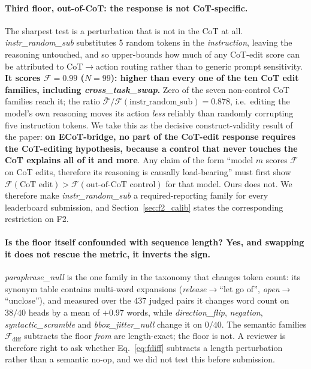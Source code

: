 \documentclass{article}
\begin{document}
\paragraph{Third floor, out-of-CoT: the response is not CoT-specific.} The sharpest test is a perturbation that is not in the CoT at all. \emph{instr\_random\_sub} substitutes 5 random tokens in the \emph{instruction}, leaving the reasoning untouched, and so upper-bounds how much of any CoT-edit score can be attributed to CoT$\to$action routing rather than to generic prompt sensitivity. \textbf{It scores $\mathcal{F} = 0.99$ ($N{=}99$): higher than every one of the ten CoT edit families, including \emph{cross\_task\_swap}.} Zero of the seven non-control CoT families reach it; the ratio $\bar{\mathcal{F}} / \mathcal{F}(\text{instr\_random\_sub}) = 0.878$, i.e.\ editing the model's own reasoning moves its action \emph{less} reliably than randomly corrupting five instruction tokens. We take this as the decisive construct-validity result of the paper: \textbf{on ECoT-bridge, no part of the CoT-edit response requires the CoT-editing hypothesis, because a control that never touches the CoT explains all of it and more}. Any claim of the form ``model $m$ scores $\mathcal{F}$ on CoT edits, therefore its reasoning is causally load-bearing'' must first show $\mathcal{F}(\text{CoT edit}) > \mathcal{F}(\text{out-of-CoT control})$ for that model. Ours does not. We therefore make \emph{instr\_random\_sub} a required-reporting family for every leaderboard submission, and Section~\ref{sec:f2_calib} states the corresponding restriction on F2.

\paragraph{Is the floor itself confounded with sequence length? Yes, and swapping it does not rescue the metric, it inverts the sign.} \emph{paraphrase\_null} is the one family in the taxonomy that changes token count: its synonym table contains multi-word expansions (\textit{release}$\to$``let go of'', \textit{open}$\to$``unclose''), and measured over the $437$ judged pairs it changes word count on $38/40$ heads by a mean of $+0.97$ words, while \emph{direction\_flip}, \emph{negation}, \emph{syntactic\_scramble} and \emph{bbox\_jitter\_null} change it on $0/40$. The semantic families $\mathcal{F}_{\text{diff}}$ subtracts the floor \emph{from} are length-exact; the floor is not. A reviewer is therefore right to ask whether Eq.~\ref{eq:fdiff} subtracts a length perturbation rather than a semantic no-op, and we did not test this before submission.
\end{document}
